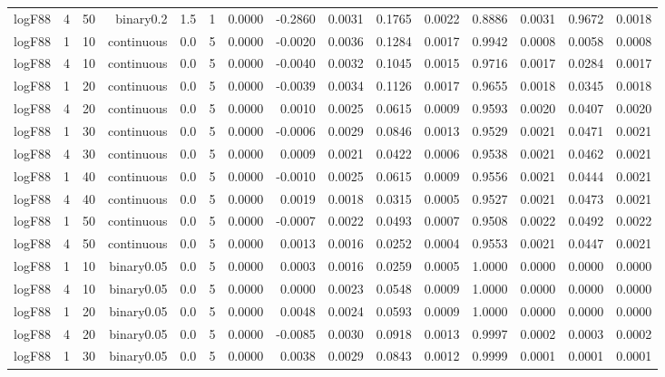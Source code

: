 \begin{longtable}{rrrrrrrrrrrrrrr}
  logF88 & 4 & 50 & binary0.2 & 1.5 & 1 & 0.0000 & -0.2860 & 0.0031 & 0.1765 & 0.0022 & 0.8886 & 0.0031 & 0.9672 & 0.0018 \\ 
  logF88 & 1 & 10 & continuous & 0.0 & 5 & 0.0000 & -0.0020 & 0.0036 & 0.1284 & 0.0017 & 0.9942 & 0.0008 & 0.0058 & 0.0008 \\ 
  logF88 & 4 & 10 & continuous & 0.0 & 5 & 0.0000 & -0.0040 & 0.0032 & 0.1045 & 0.0015 & 0.9716 & 0.0017 & 0.0284 & 0.0017 \\ 
  logF88 & 1 & 20 & continuous & 0.0 & 5 & 0.0000 & -0.0039 & 0.0034 & 0.1126 & 0.0017 & 0.9655 & 0.0018 & 0.0345 & 0.0018 \\ 
  logF88 & 4 & 20 & continuous & 0.0 & 5 & 0.0000 & 0.0010 & 0.0025 & 0.0615 & 0.0009 & 0.9593 & 0.0020 & 0.0407 & 0.0020 \\ 
  logF88 & 1 & 30 & continuous & 0.0 & 5 & 0.0000 & -0.0006 & 0.0029 & 0.0846 & 0.0013 & 0.9529 & 0.0021 & 0.0471 & 0.0021 \\ 
  logF88 & 4 & 30 & continuous & 0.0 & 5 & 0.0000 & 0.0009 & 0.0021 & 0.0422 & 0.0006 & 0.9538 & 0.0021 & 0.0462 & 0.0021 \\ 
  logF88 & 1 & 40 & continuous & 0.0 & 5 & 0.0000 & -0.0010 & 0.0025 & 0.0615 & 0.0009 & 0.9556 & 0.0021 & 0.0444 & 0.0021 \\ 
  logF88 & 4 & 40 & continuous & 0.0 & 5 & 0.0000 & 0.0019 & 0.0018 & 0.0315 & 0.0005 & 0.9527 & 0.0021 & 0.0473 & 0.0021 \\ 
  logF88 & 1 & 50 & continuous & 0.0 & 5 & 0.0000 & -0.0007 & 0.0022 & 0.0493 & 0.0007 & 0.9508 & 0.0022 & 0.0492 & 0.0022 \\ 
  logF88 & 4 & 50 & continuous & 0.0 & 5 & 0.0000 & 0.0013 & 0.0016 & 0.0252 & 0.0004 & 0.9553 & 0.0021 & 0.0447 & 0.0021 \\ 
  logF88 & 1 & 10 & binary0.05 & 0.0 & 5 & 0.0000 & 0.0003 & 0.0016 & 0.0259 & 0.0005 & 1.0000 & 0.0000 & 0.0000 & 0.0000 \\ 
  logF88 & 4 & 10 & binary0.05 & 0.0 & 5 & 0.0000 & 0.0000 & 0.0023 & 0.0548 & 0.0009 & 1.0000 & 0.0000 & 0.0000 & 0.0000 \\ 
  logF88 & 1 & 20 & binary0.05 & 0.0 & 5 & 0.0000 & 0.0048 & 0.0024 & 0.0593 & 0.0009 & 1.0000 & 0.0000 & 0.0000 & 0.0000 \\ 
  logF88 & 4 & 20 & binary0.05 & 0.0 & 5 & 0.0000 & -0.0085 & 0.0030 & 0.0918 & 0.0013 & 0.9997 & 0.0002 & 0.0003 & 0.0002 \\ 
  logF88 & 1 & 30 & binary0.05 & 0.0 & 5 & 0.0000 & 0.0038 & 0.0029 & 0.0843 & 0.0012 & 0.9999 & 0.0001 & 0.0001 & 0.0001 \\ 

\end{longtable}
